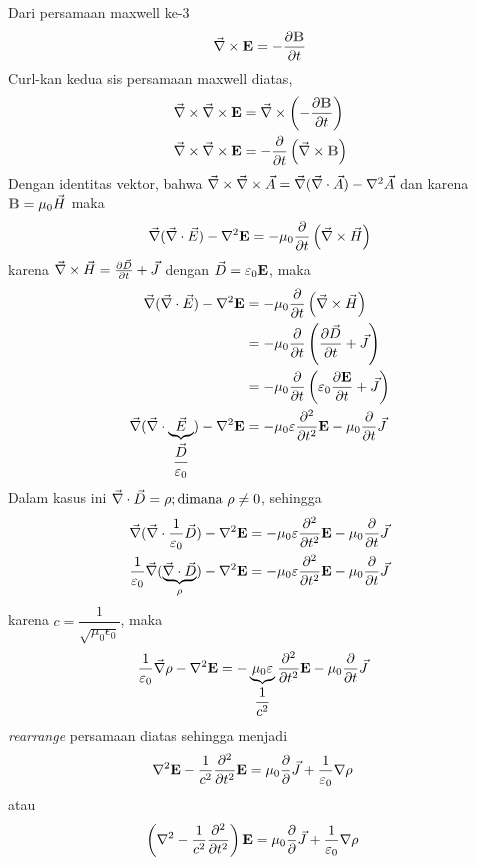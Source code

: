 Dari persamaan maxwell ke-3
\begin{equation*}
    \vnabla \times \vE = -\frac{\partial \vB}{\partial t}
\end{equation*}
Curl-kan kedua sis persamaan maxwell diatas,
\begin{align*}
    \vnabla \times \vnabla \times \vE &= \vnabla \times \left(-\frac{\partial \vB}{\partial t}\right)\\
    \vnabla \times \vnabla \times \vE &=  -\frac{\partial}{\partial t}\left(\vnabla \times \vB \right) 
\end{align*}
Dengan identitas vektor, bahwa $\vec{\nabla} \times \vec{\nabla} \times \vec{A}=\vec{\nabla}(\vec{\nabla}\cdot\vec{A})-\nabla^2 \vec{A}$ dan karena $\vB = \mu_0 \vH$ maka
\begin{align*}
    \vnabla(\vnabla\cdot\vec{E})-\nabla^2\vE=-\mu_0 \frac{\partial }{\partial t}\left(\vnabla \times \vH\right) 
\end{align*}
karena $\vec{\nabla} \times \vec{H} = \frac{\partial \vec{D}}{\partial t} + \vec{J}$ dengan $\vD = \epsilon_0 \vE$, maka
\begin{align*}
    \vnabla(\vnabla\cdot\vec{E})-\nabla^2\vE&=-\mu_0 \frac{\partial }{\partial t}\left(\vnabla \times \vH\right)\\
    &=-\mu_0 \frac{\partial }{\partial t}\left(\frac{\partial \vD}{\partial t}+\vJ\right) \\
    &=-\mu_0 \frac{\partial }{\partial t}\left(\epsilon_0\frac{\partial \vE}{\partial t}+\vJ\right) \\
    \vnabla(\vnabla\cdot\underbrace{\vec{E}}_{\dfrac{\vD}{\epsilon_0}})-\nabla^2\vE&=-\mu_0\epsilon \frac{\partial^2 }{\partial t^2}\vE-\mu_0\frac{\partial }{\partial t}\vJ
\end{align*}
Dalam kasus ini $\vec{\nabla} \cdot \vec{D} = \rho; \text{dimana } \rho \neq 0$, sehingga
\begin{align*}
    \vnabla(\vnabla\cdot\frac{1}{\epsilon_0}\vD)-\nabla^2\vE&=-\mu_0\epsilon \frac{\partial^2 }{\partial t^2}\vE-\mu_0\frac{\partial }{\partial t}\vJ\\
    \frac{1}{\epsilon_0}\vnabla(\underbrace{\vnabla\cdot\vD}_{\rho})-\nabla^2\vE&=-\mu_0\epsilon \frac{\partial^2 }{\partial t^2}\vE-\mu_0\frac{\partial }{\partial t}\vJ\\
\end{align*}
karena $c=\dfrac{1}{\sqrt{\mu_0\epsilon_0}}$, maka
\begin{align*}
    \frac{1}{\epsilon_0}\vnabla\rho-\nabla^2\vE&=-\underbrace{\mu_0\epsilon}_{\dfrac{1}{c^2}} \frac{\partial^2 }{\partial t^2}\vE-\mu_0\frac{\partial }{\partial t}\vJ
\end{align*}
\textit{rearrange} persamaan diatas sehingga menjadi
\begin{align*}
    \nabla^2\vE-\frac{1}{c^2}\frac{\partial^2 }{\partial t^2}\vE&=\mu_0\frac{\partial}{\partial}\vJ + \frac{1}{\epsilon_0}\nabla\rho
\end{align*}
atau
\begin{align*}
    \left(\nabla^2-\frac{1}{c^2}\frac{\partial^2 }{\partial t^2}\right)\vE&=\mu_0\frac{\partial}{\partial}\vJ + \frac{1}{\epsilon_0}\nabla\rho
\end{align*}